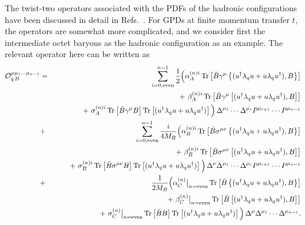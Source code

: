 \documentclass[preprintnumbers,prd,superscriptaddress,preprint]{revtex4-1}
\begin{document}
The twist-two operators associated with the PDFs of the hadronic configurations have been discussed in detail in Refs.~\cite{Wang:2016ndh, Salamu:2019dok}.
For GPDs at finite momentum transfer $t$, the operators are somewhat more complicated, and we consider first the intermediate octet baryons as the hadronic configuration as an example. 
%
The relevant operator here can be written as 
%
\begin{eqnarray}
\label{opB}
{\cal O}_{q\,B}^{\mu\mu_1\ldots\mu_{n-1}}
&=& \sum_{i=0,\rm even}^{n-1}
\frac12
\Big(
    \alpha_A^{(n)i}\,
{\rm Tr}
\left[ \bar{B} \gamma^\mu \left\{(u^\dag \lambda_q u + u \lambda_q u^\dag),B\right\}
\right] 
\nonumber\\
& & \hspace{0.73cm}
 +\ \beta_A^{(n)i}\,
{\rm Tr}
\left[ \bar{B} \gamma^\mu \left[(u^\dag \lambda_q u + u
\lambda_q u^\dag),B \right] \right]
\nonumber\\
& & \hspace{0.73cm}
 +\ \sigma_A^{(n)i}\,
{\rm Tr}
\left[\bar{B} \gamma^\mu B \right]
{\rm Tr}
\left[(u^\dag \lambda_q u + u \lambda_q u^\dag) \right]
\Big)\,
\Delta^{\mu_1} \cdots \Delta^{\mu_i} P^{\mu_{i+1}}\cdots P^{\mu_{n-1}}
\nonumber\\
&+& \sum_{i=0,\rm even}^{n-1}
\frac{i}{4M_B}
\Big(
\alpha_B^{(n)i}\,
{\rm Tr}
\left[ \bar{B} \sigma^{\mu\nu} \left\{(u^\dag \lambda_q u + u \lambda_q u^\dag),B\right\}
\right]
\nonumber\\
& & \hspace{0.73cm}
 +\ \beta_B^{(n)i}\,
{\rm Tr}
\left[ \bar{B} \sigma^{\mu\nu} \left[(u^\dag \lambda_q u + u \lambda_q u^\dag),B \right]\right]
\nonumber\\
& & \hspace{0.73cm}
 +\ \sigma_B^{(n)i}\,
{\rm Tr}
\left[ \bar{B} \sigma^{\mu\nu}B \right]
{\rm Tr}
\left[ (u^\dag \lambda_q u + u \lambda_q u^\dag) \right]
\Big)\,
\Delta^\nu \Delta^{\mu_1} \cdots \Delta^{\mu_i} P^{\mu_{i+1}}\cdots P^{\mu_{n-1}}     \nonumber\\
&+& \frac{1}{2M_B} 
\Big(
\alpha_C^{(n)}\big|_{n=\rm even}\,
{\rm Tr}
\left[ \bar{B} \left\{(u^\dag \lambda_q u + u \lambda_q u^\dag),B\right\} \right] \nonumber\\
& & \hspace{0.73cm}
 +\ \beta_C^{(n)}\big|_{n=\rm even}\,
{\rm Tr}
\left[ \bar{B} \left[(u^\dag \lambda_q u + u \lambda_q u^\dag),B \right] \right]   \nonumber\\
& & \hspace{0.73cm}
 +\ \sigma_C^{(n)}\big|_{n=\rm even}\,
{\rm Tr}
\left[ \bar{B} B \right]
{\rm Tr}
\left[ (u^\dag \lambda_q u + u \lambda_q u^\dag) \right]
\Big)\,
\Delta^\mu\Delta^{\mu_1} \cdots \Delta^{\mu_{n-1}}.
\end{eqnarray}
\end{document}
